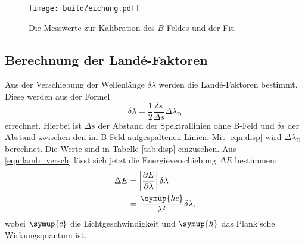 
\begin{figure}[htb]
  \centering
  \texttt{[image: build/eichung.pdf]}
  \caption{Die Messwerte zur Kalibration des $B$-Feldes und der Fit.}
  \label{fig:eichung}
\end{figure}
\FloatBarrier

\subsection{Berechnung der Landé-Faktoren}
Aus der Verschiebung der Wellenlänge $\delta\lambda$ werden die Landé-Faktoren bestimmt.
Diese werden aus der Formel
\begin{equation}
\label{eqn:lamb_versch}
\delta\lambda=\frac{1}{2}\frac{\delta s}{\Delta s}\Delta\lambda_\text{D}
\end{equation}
errechnet.
Hierbei ist $\Delta s$ der Abstand der Spektrallinien ohne B-Feld und $\delta s$ der Abstand zwischen den im B-Feld aufgespaltenen Linien.
Mit \eqref{eqn:disp} wird $\Delta\lambda_\text{D}$ berechnet.
Die Werte sind in Tabelle \ref{tab:disp} einzusehen.
Aus \eqref{eqn:lamb_versch} lässt sich jetzt die Energieverschiebung $\Delta E$ bestimmen:
\begin{align}
\label{eqn:DE}
\Delta E &= \left |\frac{\partial E}{\partial \lambda}\right |\delta \lambda\nonumber\\
&=\frac{\symup{hc}}{\lambda^2}\delta\lambda,
\end{align}
wobei $\symup{c}$ die Lichtgeschwindigkeit und $\symup{h}$ das Plank'sche Wirkungsquantum ist.



